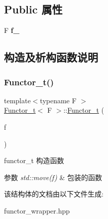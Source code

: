 \subsection*{Public 属性}
\begin{DoxyCompactItemize}
\item 
\mbox{\label{structFunctor__t_a3fe63a336dc5daebf87bdc39090caa7a}} 
F {\bfseries f\+\_\+}
\end{DoxyCompactItemize}


\subsection{构造及析构函数说明}
\mbox{\label{structFunctor__t_a1e788b8c1022f99a0e80b334b31383a2}} 
\subsubsection{\texorpdfstring{Functor\+\_\+t()}{Functor\_t()}}
{\footnotesize\ttfamily template$<$typename F $>$ \\
\hyperlink{structFunctor__t}{Functor\+\_\+t}$<$ F $>$\+::\hyperlink{structFunctor__t}{Functor\+\_\+t} (\begin{DoxyParamCaption}\item[{F \&\&}]{f }\end{DoxyParamCaption})\hspace{0.3cm}{\ttfamily [inline]}}



functor\+\_\+t 构造函数 


\begin{DoxyParams}{参数}
{\em std\+::move(f)} & 包装的函数 \\
\hline
\end{DoxyParams}


该结构体的文档由以下文件生成\+:\begin{DoxyCompactItemize}
\item 
functor\+\_\+wrapper.\+hpp\end{DoxyCompactItemize}
